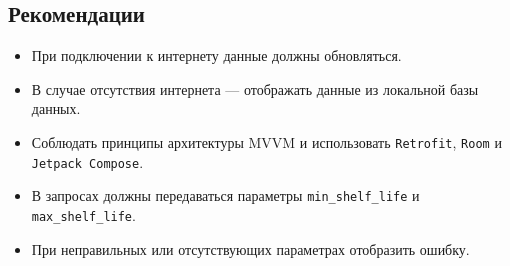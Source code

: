\subsection{Рекомендации}
\begin{itemize}
  \item При подключении к интернету данные должны обновляться.
  \item В случае отсутствия интернета — отображать данные из локальной базы данных.
  \item Соблюдать принципы архитектуры MVVM и использовать \texttt{Retrofit}, \texttt{Room} и \texttt{Jetpack Compose}.
  \item В запросах должны передаваться параметры \texttt{min_shelf_life} и \texttt{max_shelf_life}.
  \item При неправильных или отсутствующих параметрах отобразить ошибку.
\end{itemize}

